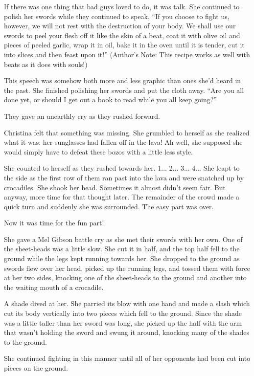 \documentclass[showtrims,b6paper,draft,10pt]{memoir}
\begin{document}
If there was one thing that bad guys loved to do, it was talk.  She continued to polish her swords while they continued to speak,  ``If you choose to fight us, however, we will not rest with the destruction of your body.  We shall use our swords to peel your flesh off it like the skin of a beat, coat it with olive oil and pieces of peeled garlic, wrap it in oil, bake it in the oven until it is tender, cut it into slices and then feast upon it!''  (Author's Note:  This recipe works as well with beats as it does with souls!)

This speech was somehow both more and less graphic than ones she'd heard in the past.  She finished polishing her swords and put the cloth away.  ``Are you all done yet, or should I get out a book to read while you all keep going?''

They gave an unearthly cry as they rushed forward.

Christina felt that something was missing.  She grumbled to herself as she realized what it was:  her sunglasses had fallen off in the lava!  Ah well, she supposed she would simply have to defeat these bozos with a little less style.

She counted to herself as they rushed towards her.  1... 2... 3... 4...  She leapt to the side as the first row of them ran past into the lava and were snatched up by crocadiles.  She shook her head.  Sometimes it almost didn't seem fair.  But anyway, more time for that thought later.  The remainder of the crowd made a quick turn and suddenly she was surrounded.    The easy part was over.

Now it was time for the fun part!

She gave a Mel Gibson battle cry as she met their swords with her own.  One of the sheet-heads was a little slow.  She cut it in half, and the top half fell to the ground while the legs kept running towards her.  She dropped to the ground as swords flew over her head, picked up the running legs, and tossed them with force at her two sides, knocking one of the sheet-heads to the ground and another into the waiting mouth of a crocadile.

A shade dived at her.  She parried its blow with one hand and made a slash which cut its body vertically into two pieces which fell to the ground.  Since the shade was a little taller than her sword was long, she picked up the half with the arm that wasn't holding the sword and swung it around, knocking many of the shades to the ground.

She continued fighting in this manner until all of her opponents had been cut into pieces on the ground.
\end{document}
